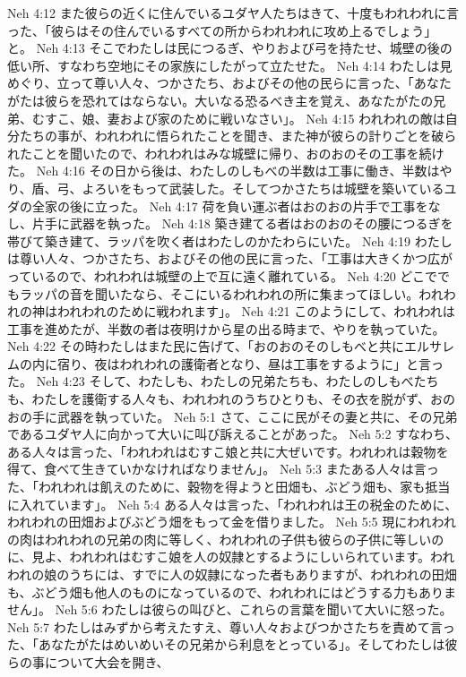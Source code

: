 Neh 4:12  また彼らの近くに住んでいるユダヤ人たちはきて、十度もわれわれに言った、「彼らはその住んでいるすべての所からわれわれに攻め上るでしょう」と。
Neh 4:13  そこでわたしは民につるぎ、やりおよび弓を持たせ、城壁の後の低い所、すなわち空地にその家族にしたがって立たせた。
Neh 4:14  わたしは見めぐり、立って尊い人々、つかさたち、およびその他の民らに言った、「あなたがたは彼らを恐れてはならない。大いなる恐るべき主を覚え、あなたがたの兄弟、むすこ、娘、妻および家のために戦いなさい」。
Neh 4:15  われわれの敵は自分たちの事が、われわれに悟られたことを聞き、また神が彼らの計りごとを破られたことを聞いたので、われわれはみな城壁に帰り、おのおのその工事を続けた。
Neh 4:16  その日から後は、わたしのしもべの半数は工事に働き、半数はやり、盾、弓、よろいをもって武装した。そしてつかさたちは城壁を築いているユダの全家の後に立った。
Neh 4:17  荷を負い運ぶ者はおのおの片手で工事をなし、片手に武器を執った。
Neh 4:18  築き建てる者はおのおのその腰につるぎを帯びて築き建て、ラッパを吹く者はわたしのかたわらにいた。
Neh 4:19  わたしは尊い人々、つかさたち、およびその他の民に言った、「工事は大きくかつ広がっているので、われわれは城壁の上で互に遠く離れている。
Neh 4:20  どこででもラッパの音を聞いたなら、そこにいるわれわれの所に集まってほしい。われわれの神はわれわれのために戦われます」。
Neh 4:21  このようにして、われわれは工事を進めたが、半数の者は夜明けから星の出る時まで、やりを執っていた。
Neh 4:22  その時わたしはまた民に告げて、「おのおのそのしもべと共にエルサレムの内に宿り、夜はわれわれの護衛者となり、昼は工事をするように」と言った。
Neh 4:23  そして、わたしも、わたしの兄弟たちも、わたしのしもべたちも、わたしを護衛する人々も、われわれのうちひとりも、その衣を脱がず、おのおの手に武器を執っていた。
Neh 5:1  さて、ここに民がその妻と共に、その兄弟であるユダヤ人に向かって大いに叫び訴えることがあった。
Neh 5:2  すなわち、ある人々は言った、「われわれはむすこ娘と共に大ぜいです。われわれは穀物を得て、食べて生きていかなければなりません」。
Neh 5:3  またある人々は言った、「われわれは飢えのために、穀物を得ようと田畑も、ぶどう畑も、家も抵当に入れています」。
Neh 5:4  ある人々は言った、「われわれは王の税金のために、われわれの田畑およびぶどう畑をもって金を借りました。
Neh 5:5  現にわれわれの肉はわれわれの兄弟の肉に等しく、われわれの子供も彼らの子供に等しいのに、見よ、われわれはむすこ娘を人の奴隷とするようにしいられています。われわれの娘のうちには、すでに人の奴隷になった者もありますが、われわれの田畑も、ぶどう畑も他人のものになっているので、われわれにはどうする力もありません」。
Neh 5:6  わたしは彼らの叫びと、これらの言葉を聞いて大いに怒った。
Neh 5:7  わたしはみずから考えたすえ、尊い人々およびつかさたちを責めて言った、「あなたがたはめいめいその兄弟から利息をとっている」。そしてわたしは彼らの事について大会を開き、
